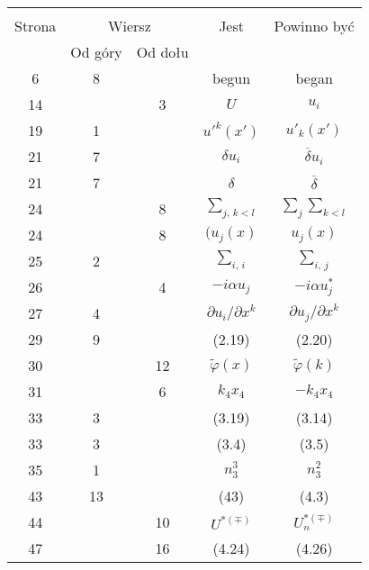 \documentclass[a4paper,11pt]{article}
\begin{document}
\vspace{\spaceFour}










\begin{center}

  \begin{tabular}{|c|c|c|c|c|}
    \hline
    & \multicolumn{2}{c|}{} & & \\
    Strona & \multicolumn{2}{c|}{Wiersz} & Jest
                              & Powinno być \\ \cline{2-3}
    & Od góry & Od dołu & & \\
    \hline
    6 & 8 & & begun & began \\
    14 & & 3 & $U$ & $u_{ i }$ \\
    19 & 1 & & $u'^{ k }( x' )$ & $u'_{ k }( x' )$ \\
    21 & 7 & & $\delta u_{ i }$ & $\overline{ \delta } u_{ i }$ \\
    21 & 7 & & $\delta$ & $\overline{ \delta }$ \\
    24 & & 8 & $\sum\limits_{ j,\, k < l }$
           & $\sum\limits_{ j } \sum\limits_{ k < l }$ \\
    24 & & 8 & $( u_{ j }( x )$ & $u_{ j }( x )$ \\
    25 & 2 & & $\sum\limits_{ i,\, i }$ & $\sum\limits_{ i,\, j }$ \\
    26 & & 4 & $-i \alpha u_{ j }$ & $-i \alpha u_{ j }^{ * }$ \\
    27 & 4 & & $\partial u_{ i } / \partial x^{ k }$
           & $\partial u_{ j } / \partial x^{ k }$ \\
    29 & 9 & & (2.19) & (2.20) \\
    30 & & 12 & $\tilde{ \varphi }( x )$ & $\tilde{ \varphi }( k )$ \\
    31 & & 6 & $k_{ 4 } x_{ 4 }$ & $-k_{ 4 } x_{ 4 }$ \\
    33 & 3 & & (3.19) & (3.14) \\
    33 & 3 & & (3.4) & (3.5) \\
    35 & 1 & & $n_{ 3 }^{ 3 }$ & $n_{ 3 }^{ 2 }$ \\
    43 & 13 & & (43) & (4.3) \\
    44 & & 10 & $U^{ *( \mp ) }$ & $U_{ n }^{ *( \mp ) }$ \\
    47 & & 16 & (4.24) & (4.26) \\

\end{tabular}
\end{center}
\end{document}
